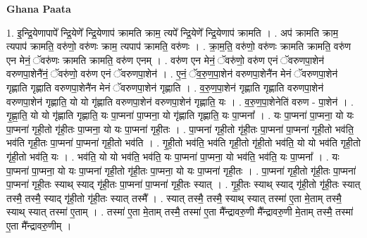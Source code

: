 \documentclass[17pt]{extarticle}
\begin{document}
\textbf{Ghana Paata } \newline

1. इ॒न्द्रि॒येणापापे᳚ न्द्रि॒येणे᳚ न्द्रि॒येणाप॑ क्रामति क्राम॒ त्यपे᳚ न्द्रि॒येणे᳚ न्द्रि॒येणाप॑ क्रामति । . अप॑ क्रामति क्राम॒ त्यपाप॑ क्रामति॒ वरु॑णो॒ वरु॑णः क्राम॒ त्यपाप॑ क्रामति॒ वरु॑णः । . क्रा॒म॒ति॒ वरु॑णो॒ वरु॑णः क्रामति क्रामति॒ वरु॑ण एन मेनं॒ ॅवरु॑णः क्रामति क्रामति॒ वरु॑ण एनम् । . वरु॑ण एन मेनं॒ ॅवरु॑णो॒ वरु॑ण एनं ॅवरुणपा॒शेन॑ वरुणपा॒शेनै॑नं॒ ॅवरु॑णो॒ वरु॑ण एनं ॅवरुणपा॒शेन॑ । . ए॒नं॒ ॅव॒रु॒ण॒पा॒शेन॑ वरुणपा॒शेनै॑न मेनं ॅवरुणपा॒शेन॑ गृह्णाति गृह्णाति वरुणपा॒शेनै॑न मेनं ॅवरुणपा॒शेन॑ गृह्णाति । . व॒रु॒ण॒पा॒शेन॑ गृह्णाति गृह्णाति वरुणपा॒शेन॑ वरुणपा॒शेन॑ गृह्णाति॒ यो यो गृ॑ह्णाति वरुणपा॒शेन॑ वरुणपा॒शेन॑ गृह्णाति॒ यः । . व॒रु॒ण॒पा॒शेनेति॑ वरुण - पा॒शेन॑ । . गृ॒ह्णा॒ति॒ यो यो गृ॑ह्णाति गृह्णाति॒ यः पा॒प्मना॑ पा॒प्मना॒ यो गृ॑ह्णाति गृह्णाति॒ यः पा॒प्मना᳚ । . यः पा॒प्मना॑ पा॒प्मना॒ यो यः पा॒प्मना॑ गृही॒तो गृ॑ही॒तः पा॒प्मना॒ यो यः पा॒प्मना॑ गृही॒तः । . पा॒प्मना॑ गृही॒तो गृ॑ही॒तः पा॒प्मना॑ पा॒प्मना॑ गृही॒तो भव॑ति॒ भव॑ति गृही॒तः पा॒प्मना॑ पा॒प्मना॑ गृही॒तो भव॑ति । . गृ॒ही॒तो भव॑ति॒ भव॑ति गृही॒तो गृ॑ही॒तो भव॑ति॒ यो यो भव॑ति गृही॒तो गृ॑ही॒तो भव॑ति॒ यः । . भव॑ति॒ यो यो भव॑ति॒ भव॑ति॒ यः पा॒प्मना॑ पा॒प्मना॒ यो भव॑ति॒ भव॑ति॒ यः पा॒प्मना᳚ । . यः पा॒प्मना॑ पा॒प्मना॒ यो यः पा॒प्मना॑ गृही॒तो गृ॑ही॒तः पा॒प्मना॒ यो यः पा॒प्मना॑ गृही॒तः । . पा॒प्मना॑ गृही॒तो गृ॑ही॒तः पा॒प्मना॑ पा॒प्मना॑ गृही॒तः स्याथ् स्याद् गृ॑ही॒तः पा॒प्मना॑ पा॒प्मना॑ गृही॒तः स्यात् । . गृ॒ही॒तः स्याथ् स्याद् गृ॑ही॒तो गृ॑ही॒तः स्यात् तस्मै॒ तस्मै॒ स्याद् गृ॑ही॒तो गृ॑ही॒तः स्यात् तस्मै᳚ । . स्यात् तस्मै॒ तस्मै॒ स्याथ् स्यात् तस्मा॑ ए॒ता मे॒ताम् तस्मै॒ स्याथ् स्यात् तस्मा॑ ए॒ताम् । . तस्मा॑ ए॒ता मे॒ताम् तस्मै॒ तस्मा॑ ए॒ता मै᳚न्द्रावरु॒णी मै᳚न्द्रावरु॒णी मे॒ताम् तस्मै॒ तस्मा॑ ए॒ता मै᳚न्द्रावरु॒णीम् । \newline
\end{document}
